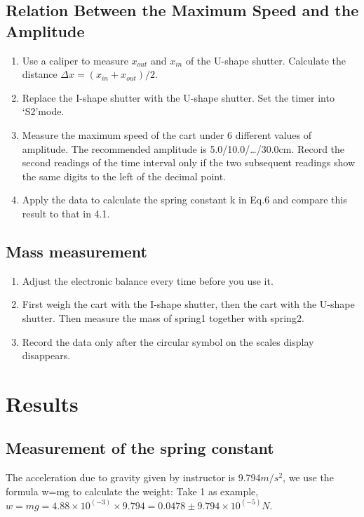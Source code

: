 \documentclass[12pt,a4paper]{article}
\begin{document}
\subsection{ Relation Between the Maximum Speed and the Amplitude}
\begin{enumerate}[1.]
    \item   Use a caliper to measure $x_{out}$ and $x_{in}$ of the U-shape shutter. Calculate the distance $\Delta x=(x_{in}+x_{out})/2$.
    \item Replace the I-shape shutter with the U-shape shutter. Set the timer into ‘S2’mode.
    \item  Measure the maximum speed of the cart under 6 different values of amplitude. The recommended amplitude is 5.0/10.0/…/30.0cm. Record the second readings of the time interval only if the two subsequent readings show the same digits to the left of the decimal point.
    \item  Apply the data to calculate the spring constant k in Eq.6 and compare this result to that in 4.1.
\end{enumerate}

\subsection{Mass measurement}
\begin{enumerate}[1.]
    \item Adjust the electronic balance every time before you use it.
    \item First weigh the cart with the I-shape shutter, then the cart with the U-shape shutter. Then measure the mass of spring1 together with spring2.
    \item Record the data only after the circular symbol on the scales display disappears.
\end{enumerate}

\section{Results}
\subsection{Measurement of the spring constant}

The acceleration due to gravity given by instructor is 9.794$m/s^2$, we use the formula w=mg to calculate the weight:
Take 1 as example, $w=mg=4.88\times 10^(-3)\times 9.794=0.0478\pm 9.794\times 10^(-5) N.$
\end{document}
